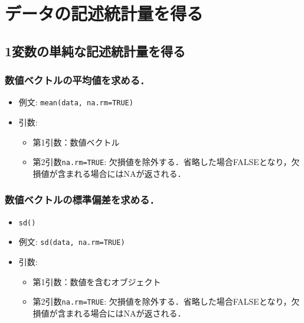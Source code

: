 \documentclass[
  xelatex, ja=standard]{bxjsarticle}
\providecommand{\tightlist}{%
  \setlength{\itemsep}{0pt}\setlength{\parskip}{0pt}}
\begin{document}
\section{データの記述統計量を得る}\label{ux30c7ux30fcux30bfux306eux8a18ux8ff0ux7d71ux8a08ux91cfux3092ux5f97ux308b}

\subsection{1変数の単純な記述統計量を得る}\label{ux5909ux6570ux306eux5358ux7d14ux306aux8a18ux8ff0ux7d71ux8a08ux91cfux3092ux5f97ux308b}

\subsubsection{数値ベクトルの平均値を求める．}\label{ux6570ux5024ux30d9ux30afux30c8ux30ebux306eux5e73ux5747ux5024ux3092ux6c42ux3081ux308b}

\begin{itemize}
\tightlist
\item
  例文: \texttt{mean(data,\ na.rm=TRUE)}
\item
  引数:

  \begin{itemize}
  \tightlist
  \item
    第1引数：数値ベクトル
  \item
    第2引数\texttt{na.rm=TRUE}:
    欠損値を除外する．省略した場合FALSEとなり，欠損値が含まれる場合にはNAが返される．
  \end{itemize}
\end{itemize}

\subsubsection{数値ベクトルの標準偏差を求める．}\label{ux6570ux5024ux30d9ux30afux30c8ux30ebux306eux6a19ux6e96ux504fux5deeux3092ux6c42ux3081ux308b}

\begin{itemize}
\tightlist
\item
  \texttt{sd()}
\item
  例文: \texttt{sd(data,\ na.rm=TRUE)}
\item
  引数:

  \begin{itemize}
  \tightlist
  \item
    第1引数：数値を含むオブジェクト
  \item
    第2引数\texttt{na.rm=TRUE}:
    欠損値を除外する．省略した場合FALSEとなり，欠損値が含まれる場合にはNAが返される．
  \end{itemize}
\end{itemize}
\end{document}
